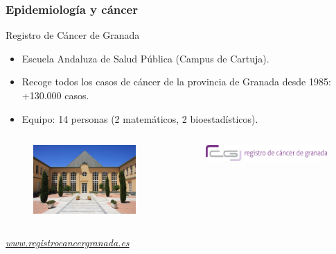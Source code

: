 \documentclass{beamer}
\begin{document}
\begin{frame}\frametitle{Epidemiología y cáncer}

\begin{block}{Registro de Cáncer de Granada}
	\begin{itemize}
		\item Escuela Andaluza de Salud Pública (Campus de Cartuja).
		\item Recoge todos los casos de cáncer de la provincia de Granada desde 1985: +130.000 casos.
		\item Equipo: 14 personas (2 matemáticos, 2 bioestadísticos).
	\end{itemize}
	
\vspace{-10pt}	
\begin{columns}
	\begin{column}{.5\textwidth}
	\begin{figure}
		\centering
		\includegraphics[width=.9\textwidth]{images/registro.jpg}
	\end{figure}
	\end{column}
	\begin{column}{.5\textwidth}
	\begin{figure}
		\centering
	\includegraphics[width=.9\textwidth]{logos/logo_rcg.png}
	\end{figure}
\end{column}
\end{columns}

\vspace{5pt}
\centering
\textit{\url{www.registrocancergranada.es}}

\end{block}

\end{frame}
\end{document}

